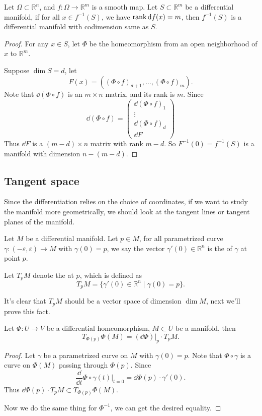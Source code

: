 \begin{proposition}
	Let $\Omega \subset \mathbb{R}^{n}$, and $f: \Omega \to \mathbb{R}^{m}$ is
	a smooth map. Let $S \subset \mathbb{R}^{m}$ be a differential manifold,
	if for all $x\in f^{-1}(S)$, we have $\operatorname{rank}\mathop{}\!\mathrm{d} f(x) = m$, then $f^{-1}(S)$ is
	a differential manifold with codimension same as $S$.
\end{proposition}
\begin{proof}[Proof]
    For any $x\in S$, let $\Phi$ be the homeomorphism
	from an open neighborhood of $x$ to $\mathbb{R}^{m}$.

	Suppose $\dim S = d$,
	let
	\[
	F(x) = ((\Phi \circ f)_{d+1}, \dots, (\Phi\circ f)_{m}).
	\]
	Note that $\dd (\Phi \circ f)$ is an $m\times n$ matrix,
	and its rank is $m$. Since
	\[
	\dd (\Phi\circ f) = \begin{pmatrix}
		\dd(\Phi\circ f)_1\\\vdots\\\dd(\Phi\circ f)_d\\\dd F
	\end{pmatrix}
	\]
	Thus $\dd F$ is a $(m-d)\times n$ matrix with rank $m - d$.
	So $F^{-1}(0) = f^{-1}(S)$ is a manifold with dimension $n - (m - d)$.
\end{proof}

\subsection{Tangent space}
\label{sub:Tangent space}
Since the differentiation relies on the choice of coordinates, if we
want to study the manifold more geometrically, we should look at the tangent lines
or tangent planes of the manifold.
\begin{definition}
	Let $M$ be a differential manifold. Let $p\in M$,
	for all parametrized curve $\gamma: (-\varepsilon, \varepsilon)\to M$
	with $\gamma(0) = p$, we say the vector $\gamma'(0)\in \mathbb{R}^{n}$ is
	the  of $\gamma$ at point $p$.

	Let $T_pM$ denote the  at $p$, which is defined as
	\[
	T_pM = \{\gamma'(0)\in \mathbb{R}^{n} \mid \gamma(0) = p\}.
	\]
\end{definition}
It's clear that $T_pM$ should be a vector space of dimension $\dim M$,
next we'll prove this fact.

\begin{proposition}
	Let $\Phi: U\to V$ be a differential homeomorphism, $M \subset U$ be
	a manifold, then
	\[
		T_{\Phi(p)}\Phi(M) = (\dd \Phi)\big|_{p} \cdot T_pM.
	\]
\end{proposition}
\begin{proof}[Proof]
    Let $\gamma$ be a parametrized curve on $M$ with $\gamma(0) = p$.
	Note that $\Phi\circ \gamma$ is a curve on  $\Phi(M)$ passing through $\Phi(p)$.
	Since
	\[
	\frac{\dd}{\dd t} \Phi\circ \gamma(t)\Big|_{t=0} = \dd \Phi(p) \cdot \gamma'(0).
	\]
	Thus $\dd \Phi(p)\cdot T_p M \subset T_{\Phi(p)}\Phi(M)$.

	Now we do the same thing for $\Phi^{-1}$, we can get the desired equality.
\end{proof}

